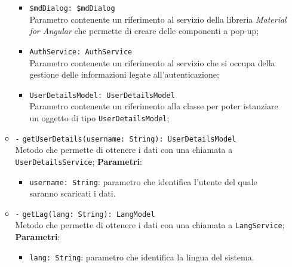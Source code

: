 \begin{itemize}
\begin{itemize}
\begin{itemize}
					\item \texttt{\$mdDialog: \$mdDialog} \\
					Parametro contenente un riferimento al servizio della libreria \textit{Material for Angular} che permette di creare delle componenti a pop-up;
					\item \texttt{AuthService: AuthService} \\
					Parametro contenente un riferimento al servizio che si occupa della gestione delle informazioni legate all’autenticazione;
					\item \texttt{UserDetailsModel: UserDetailsModel} \\
					Parametro contenente un riferimento alla classe per poter istanziare un oggetto di tipo \texttt{UserDetailsModel};
				\end{itemize}
				\item \texttt{-} \texttt{getUserDetails(username: String): UserDetailsModel} \\ Metodo che permette di ottenere i dati con una chiamata a \texttt{UserDetailsService};
				\textbf{Parametri}:
				\begin{itemize}
					\item \texttt{username: String}: parametro che identifica l'utente del quale saranno scaricati i dati.
				\end{itemize}
				\item \texttt{-} \texttt{getLag(lang: String): LangModel} \\ Metodo che permette di ottenere i dati con una chiamata a \texttt{LangService}; \\
				\textbf{Parametri}:
				\begin{itemize}
					\item \texttt{lang: String}: parametro che identifica la lingua del sistema.
				\end{itemize}
			\end{itemize}
		\end{itemize}
		
